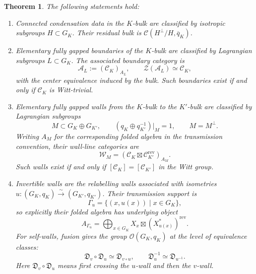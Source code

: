 \documentclass[12pt]{amsart}
\numberwithin{equation}{section}
\newtheorem{theorem}{Theorem}[section]
\theoremstyle{definition}
\begin{document}
\newpage
\begin{theorem}
\label{thm:defect-classification}
The following statements hold:
\begin{enumerate}[label=\rm(\arabic*)]
\item Connected condensation data in the $K$-bulk are classified by
isotropic subgroups $H\subset G_K$. Their residual bulk is
$\mathcal C(H^\perp/H,\overline q_K)$.

\item Elementary fully gapped boundaries of the $K$-bulk are
classified by Lagrangian subgroups $L\subset G_K$. The associated
boundary category is
$$
\mathcal A_L:=(\mathcal C_K)_{A_L},\qquad
\mathcal Z(\mathcal A_L)\simeq\mathcal C_K,
$$
with the center equivalence induced by the bulk.
Such boundaries exist if and only if $\mathcal C_K$ is Witt-trivial.

\item Elementary fully gapped walls from the $K$-bulk to the
$K'$-bulk are classified by Lagrangian subgroups
$$
M\subset G_K\oplus G_{K'},\qquad
(q_K\oplus q_{K'}^{-1})|_M=1,\qquad M=M^\perp.
$$
Writing $A_M$ for the corresponding folded algebra in the
transmission convention, their wall-line categories are
$$
\mathcal W_M=
(\mathcal C_K\boxtimes\mathcal C_{K'}^{\mathrm{rev}})_{A_M}.
$$
Such walls exist if and only if
$[\mathcal C_K]=[\mathcal C_{K'}]$ in the Witt group.



\item Invertible walls are the relabelling walls associated with
isometries $u:(G_K,q_K)\xrightarrow{\sim}(G_{K'},q_{K'})$.
Their transmission support is
$$
\Gamma_u=\{(x,u(x))\mid x\in G_K\},
$$
so explicitly their folded algebra has underlying object
$$
A_{\Gamma_u}=
\bigoplus_{x\in G_K}X_x\boxtimes(X_{u(x)}^*)^{\mathrm{rev}}.
$$
For self-walls, fusion gives the group
$\mathcal O(G_K,q_K)$ at the level of equivalence classes:
$$
\mathfrak D_v\circ\mathfrak D_u\simeq\mathfrak D_{v\circ u},
\qquad
\mathfrak D_u^{-1}\simeq\mathfrak D_{u^{-1}}.
$$
Here $\mathfrak D_v\circ\mathfrak D_u$ means first crossing the
$u$-wall and then the $v$-wall.
\end{enumerate}
\end{theorem}
\end{document}
